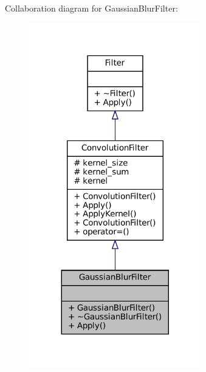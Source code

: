 Collaboration diagram for Gaussian\+Blur\+Filter\+:\nopagebreak
\begin{figure}[H]
\begin{center}
\leavevmode
\includegraphics[width=212pt]{classGaussianBlurFilter__coll__graph}
\end{center}
\end{figure}
